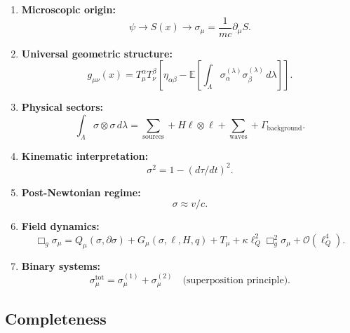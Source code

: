 \documentclass[11pt,a4paper]{article}
\theoremstyle{definition}
\theoremstyle{remark}
\begin{document}
	\begin{enumerate}
		\item \textbf{Microscopic origin:}
		\begin{equation}
			\psi \rightarrow S(x) \rightarrow \sigma_\mu = \frac{1}{mc}\partial_\mu S.
		\end{equation}
		
		\item \textbf{Universal geometric structure:}
		\begin{equation}
			g_{\mu\nu}(x) = T^\alpha_\mu T^\beta_\nu \left[\eta_{\alpha\beta} - \mathbb{E}\left[\int_\Lambda \sigma_\alpha^{(\lambda)} \sigma_\beta^{(\lambda)} \, d\lambda\right]\right].
		\end{equation}
		
		\item \textbf{Physical sectors:}
		\begin{equation}
			\int_\Lambda \sigma \otimes \sigma \, d\lambda = \sum_{\text{sources}} + H\ell\otimes\ell + \sum_{\text{waves}} + \Gamma_{\text{background}}.
		\end{equation}
		
		\item \textbf{Kinematic interpretation:}
		\begin{equation}
			\sigma^2 = 1 - (d\tau/dt)^2.
		\end{equation}
		
		\item \textbf{Post-Newtonian regime:}
		\begin{equation}
			\sigma \approx v/c.
		\end{equation}
		
		\item \textbf{Field dynamics:}
		\begin{equation}
			\Box_g \sigma_\mu = Q_\mu(\sigma, \partial\sigma) + G_\mu(\sigma, \ell, H, q) + T_\mu + \kappa\ell_Q^2 \Box_g^2 \sigma_\mu + \mathcal{O}(\ell_Q^4).
		\end{equation}
		
		\item \textbf{Binary systems:}
		\begin{equation}
			\sigma_\mu^{\text{tot}} = \sigma_\mu^{(1)} + \sigma_\mu^{(2)} \quad \text{(superposition principle)}.
		\end{equation}
	\end{enumerate}
	
	\subsection{Completeness}
	
\end{document}
